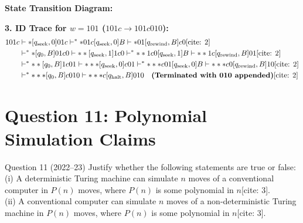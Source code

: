 \documentclass[11pt,a4paper]{article}
\begin{document}
\begin{solutionbox}
\textbf{State Transition Diagram:}
\begin{center}
\end{center}

\textbf{3. ID Trace for $w = 101$ ($101c \rightarrow 101c010$):}
\begin{align*}
[q_0, B]101c &\vdash * [q_{\text{seek}}, 0] 01c \vdash^* *01c [q_{\text{seek}}, 0] B \vdash *01 [q_{\text{rewind}}, B] c0 \text{[cite: 2]} \\
&\vdash^* * [q_0, B] 01c0 \vdash ** [q_{\text{seek}}, 1] 1c0 \vdash^* **1c0 [q_{\text{seek}}, 1] B \vdash **1c [q_{\text{rewind}}, B] 01 \text{[cite: 2]} \\
&\vdash^* ** [q_0, B] 1c01 \vdash *** [q_{\text{seek}}, 0] c01 \vdash^* ***c01 [q_{\text{seek}}, 0] B \vdash ***c0 [q_{\text{rewind}}, B] 10 \text{[cite: 2]} \\
&\vdash^* *** [q_0, B] c010 \vdash ***c [q_{\text{halt}}, B] 010 \quad \text{\textbf{(Terminated with 010 appended)}} \text{[cite: 2]}
\end{align*}
\end{solutionbox}

\section{Question 11: Polynomial Simulation Claims}
\begin{questionbox}{Question 11 (2022--23)}
Justify whether the following statements are true or false: \\
(i) A deterministic Turing machine can simulate $n$ moves of a conventional computer in $P(n)$ moves, where $P(n)$ is some polynomial in $n$[cite: 3]. \\
(ii) A conventional computer can simulate $n$ moves of a non-deterministic Turing machine in $P(n)$ moves, where $P(n)$ is some polynomial in $n$[cite: 3].
\end{questionbox}
\end{document}
